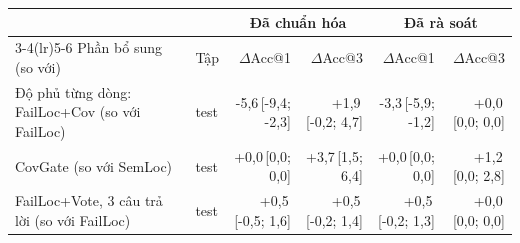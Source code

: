 \begin{tabular}{llrrrr}
\toprule
 & & \multicolumn{2}{c}{Đã chuẩn hóa} & \multicolumn{2}{c}{Đã rà soát} \\
\cmidrule(lr){3-4}\cmidrule(lr){5-6}
Phần bổ sung (so với) & Tập & $\Delta$Acc@1 & $\Delta$Acc@3 & $\Delta$Acc@1 & $\Delta$Acc@3 \\
\midrule
Độ phủ từng dòng: FailLoc+Cov (so với FailLoc) & test & -5,6{\scriptsize\,[-9,4; -2,3]} & +1,9{\scriptsize\,[-0,2; 4,7]} & -3,3{\scriptsize\,[-5,9; -1,2]} & +0,0{\scriptsize\,[0,0; 0,0]} \\
CovGate (so với SemLoc) & test & +0,0{\scriptsize\,[0,0; 0,0]} & +3,7{\scriptsize\,[1,5; 6,4]} & +0,0{\scriptsize\,[0,0; 0,0]} & +1,2{\scriptsize\,[0,0; 2,8]} \\
FailLoc+Vote, 3 câu trả lời (so với FailLoc) & test & +0,5{\scriptsize\,[-0,5; 1,6]} & +0,5{\scriptsize\,[-0,2; 1,4]} & +0,5{\scriptsize\,[-0,2; 1,3]} & +0,0{\scriptsize\,[0,0; 0,0]} \\
\bottomrule
\end{tabular}
